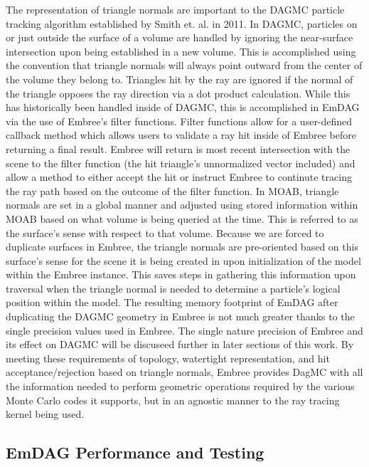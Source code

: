 \documentclass[12pt, a4paper]{article}
\begin{document}
The representation of triangle normals are important to the DAGMC particle tracking algorithm established by Smith et. al. \cite{smith_thesis_2011} in 2011. In DAGMC, particles on or just outside the surface of a volume are handled by ignoring the near-surface intersection upon being established in a new volume. This is accomplished using the convention that triangle normals will always point outward from the center of the volume they belong to. Triangles hit by the ray are ignored if the normal of the triangle opposes the ray direction via a dot product calculation. While this has historically been handled inside of DAGMC, this is accomplished in EmDAG via the use of Embree's filter functions. Filter functions allow for a user-defined callback method which allows users to validate a ray hit inside of Embree before returning a final result. Embree will return is most recent intersection with the scene to the filter function (the hit triangle's unnormalized vector included) and allow a method to either accept the hit or instruct Embree to continute tracing the ray path based on the outcome of the filter function. In MOAB, triangle normals are set in a global manner and adjusted using stored information within MOAB based on what volume is being queried at the time. This is referred to as the surface's sense with respect to that volume. Because we are forced to duplicate surfaces in Embree, the triangle normals are pre-oriented based on this surface's sense for the scene it is being created in upon initialization of the model within the Embree instance. This saves steps in gathering this information upon traversal when the triangle normal is needed to determine a particle's logical position within the model. The resulting memory footprint of EmDAG after duplicating the DAGMC geometry in Embree is not much greater thanks to the single precision values used in Embree. The single nature precision of Embree and its effect on DAGMC will be discuseed further in later sections of this work.
By meeting these requirements of topology, watertight representation, and hit acceptance/rejection based on triangle normals, Embree provides DagMC with all the information needed to perform geometric operations required by the various Monte Carlo codes it supports, but in an agnostic manner to the ray tracing kernel being used.

\subsection{EmDAG Performance and Testing}%
\end{document}
